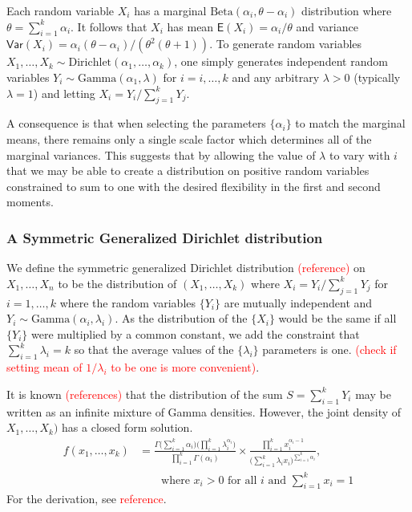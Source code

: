\documentclass[useAMS,usenatbib]{biom}
\newcommand{\falta}[1]{\textcolor{red}{#1}}
\begin{document}
Each random variable $X_i$ has a marginal
$\text{Beta}(\alpha_i,\theta-\alpha_i)$ distribution where $\theta =
\sum_{i=1}^k \alpha_i$.  It follows that $X_i$ has mean
$\mathsf{E}(X_i) = \alpha_i/\theta$ and variance $\mathsf{Var}(X_i) =
\alpha_i(\theta-\alpha_i) / ( \theta^2(\theta+1) )$.  To generate
random variables $X_1,\ldots,X_k \sim
\text{Dirichlet}(\alpha_1,\ldots,\alpha_k)$, one simply generates
independent random variables $Y_i \sim \text{Gamma}(\alpha_1,\lambda)$
for $i=i,\ldots,k$ and any arbitrary $\lambda>0$ (typically
$\lambda=1$) and letting $X_i = Y_i / \sum_{j=1}^k Y_j$.

A consequence is that when selecting the parameters $\{\alpha_i\}$ to
match the marginal means, there remains only a single scale factor
which determines all of the marginal variances. This
suggests that by allowing the value of $\lambda$ to vary with $i$ that
we may be able to create a distribution on positive random variables
constrained to sum to one with the desired flexibility in the first
and second moments.

\subsubsection{A Symmetric Generalized Dirichlet distribution}

We define the symmetric generalized Dirichlet distribution
\falta{(reference)} on $X_1,\ldots,X_n$ to be the distribution of
$(X_1,\ldots,X_k)$ where $X_i = Y_i \big/ \sum_{j=1}^k Y_j$ for
$i=1,\ldots,k$ where the random variables $\{Y_i\}$ are mutually
independent and $Y_i \sim \text{Gamma}(\alpha_i,\lambda_i)$.  As the
distribution of the $\{X_i\}$ would be the same if all $\{Y_i\}$ were
multiplied by a common constant, we add the constraint that
$\sum_{i=1}^k \lambda_i = k$ so that the average values of the
$\{\lambda_i\}$ parameters is one.  \falta{(check if setting mean of
  $1/\lambda_i$ to be one is more convenient)}.

It is known \falta{(references)} that the distribution of the sum $S =
\sum_{i=1}^k Y_i$ may be written as an infinite mixture of Gamma
densities.  However, the joint density of $X_1,\ldots,X_k)$ has a
closed form solution.
\begin{eqnarray*}
  f(x_1,\ldots,x_k) &= \frac{\Gamma\big(\sum_{i=1}^k
    \alpha_i\big)\big(\prod_{i=1}^k
    \lambda_i^{\alpha_i}\big)}{\prod_{i=1}^k \Gamma(\alpha_i)}
  \times \frac{\prod_{i=1}^k x_i^{\alpha_i - 1}}{\big(\sum_{i=1}^k
    \lambda_i x_i\big)^{\sum_{i=1}^k \alpha_i}},\\ 
  & \qquad \text{where
    $x_i > 0$ for all $i$ and $\sum_{i=1}^k x_i = 1$}
\end{eqnarray*}
For the derivation, see \falta{reference}. 
\end{document}
